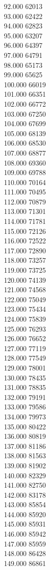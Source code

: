 { 92.000	62013 \\
 93.000	62422 \\
 94.000	62823 \\
 95.000	63207 \\
 96.000	64397 \\
 97.000	64791 \\
 98.000	65173 \\
 99.000	65625 \\
 100.000	66019 \\
 101.000	66351 \\
 102.000	66772 \\
 103.000	67250 \\
 104.000	67699 \\
 105.000	68139 \\
 106.000	68530 \\
 107.000	68877 \\
 108.000	69360 \\
 109.000	69788 \\
 110.000	70164 \\
 111.000	70495 \\
 112.000	70879 \\
 113.000	71301 \\
 114.000	71781 \\
 115.000	72126 \\
 116.000	72522 \\
 117.000	72890 \\
 118.000	73257 \\
 119.000	73725 \\
 120.000	74139 \\
 121.000	74568 \\
 122.000	75049 \\
 123.000	75434 \\
 124.000	75839 \\
 125.000	76293 \\
 126.000	76652 \\
 127.000	77119 \\
 128.000	77549 \\
 129.000	78001 \\
 130.000	78435 \\
 131.000	78835 \\
 132.000	79191 \\
 133.000	79586 \\
 134.000	79973 \\
 135.000	80422 \\
 136.000	80819 \\
 137.000	81186 \\
 138.000	81563 \\
 139.000	81902 \\
 140.000	82329 \\
 141.000	82750 \\
 142.000	83178 \\
 143.000	85854 \\
 144.000	85920 \\
 145.000	85931 \\
 146.000	85942 \\
 147.000	85959 \\
 148.000	86428 \\
 149.000	86861 \\
}
